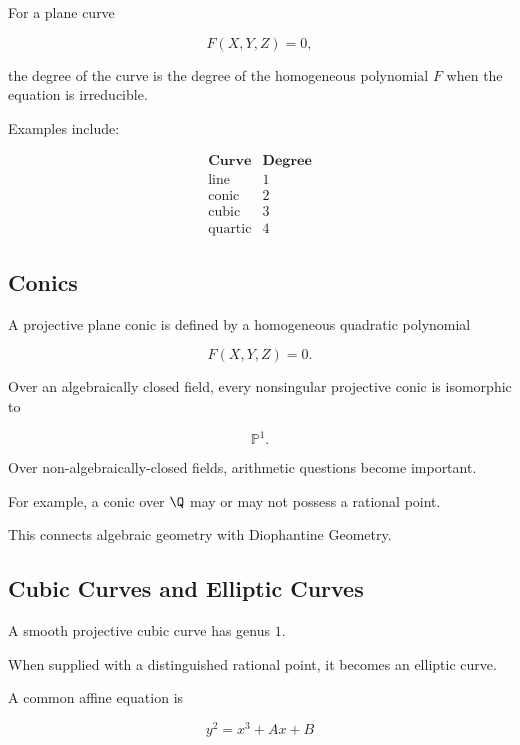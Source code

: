 For a plane curve

\[
F(X,Y,Z)=0,
\]

the degree of the curve is the degree of the homogeneous polynomial \(F\)
when the equation is irreducible.

Examples include:

\[
\boxed{
\begin{array}{c|c}
\textbf{Curve} & \textbf{Degree}\\
\hline
\text{line} & 1\\
\text{conic} & 2\\
\text{cubic} & 3\\
\text{quartic} & 4
\end{array}
}
\]

\subsection{Conics}
\label{subsec:algebraic-conics}

A projective plane conic is defined by a homogeneous quadratic polynomial

\[
\boxed{
F(X,Y,Z)=0.
}
\]

Over an algebraically closed field, every nonsingular projective conic is
isomorphic to

\[
\mathbb{P}^1.
\]

Over non-algebraically-closed fields, arithmetic questions become important.

For example, a conic over \(\Q\) may or may not possess a rational point.

This connects algebraic geometry with Diophantine Geometry.

\subsection{Cubic Curves and Elliptic Curves}
\label{subsec:algebraic-cubic-curves}

A smooth projective cubic curve has genus \(1\).

When supplied with a distinguished rational point, it becomes an elliptic
curve.

A common affine equation is

\[
\boxed{
y^2=x^3+Ax+B
}
\]

